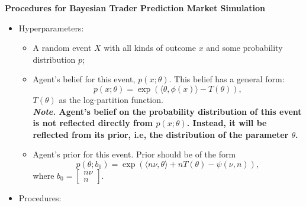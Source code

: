 \documentclass[12pt]{article}
\begin{document}
\begin{center}
    \textbf{\large Procedures for Bayesian Trader Prediction Market Simulation}
\end{center}

\begin{itemize}
    \item Hyperparameters:
          \begin{itemize}[label=$\circ$]
              \item A random event $X$ with all kinds of outcome $x$ and some probability distribution $p$;
              \item Agent's belief for this event, $p(x;\theta)$. This belief has a general form: \[ p(x;\theta)=\exp\left( \langle\theta,\phi(x)\rangle-T(\theta) \right), \] $T(\theta)$ as the log-partition function.
                    \\\textbf{\textit{Note.} Agent's belief on the probability distribution of this event is not reflected directly from $p(x;\theta)$. Instead, it will be reflected from its prior, i.e, the distribution of the parameter $\theta$.}
              \item Agent's prior for this event. Prior should be of the form \[ p(\theta;b_0)=\exp\left( \langle n\nu,\theta\rangle+nT(\theta)-\psi(\nu,n) \right), \] where $b_0=\begin{bmatrix}
                            n\nu \\n
                        \end{bmatrix}$.
          \end{itemize}
    \item Procedures:
\end{itemize}
\end{document}
